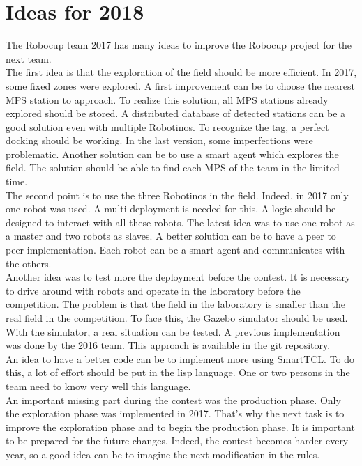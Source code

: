 \section{Ideas for 2018}

The Robocup team 2017 has many ideas to improve the Robocup project for the next team.\\

The first idea is that the exploration of the field should be more efficient. In 2017, some fixed zones were explored. A first improvement can be to choose the nearest MPS station to approach. To realize this solution, all MPS stations already explored should be stored. A distributed database of detected stations can be a good solution even with multiple Robotinos. To recognize the tag, a perfect docking should be working. In the last version, some imperfections were problematic. Another solution can be to use a smart agent which explores the field. The solution should be able to find each MPS of the team in the limited time.\\

The second point is to use the three Robotinos in the field. Indeed, in 2017 only one robot was used. A multi-deployment is needed for this. A logic should be designed to interact with all these robots. The latest idea was to use one robot as a master and two robots as slaves. A better solution can be to have a peer to peer implementation. Each robot can be a smart agent and communicates with the others.\\

Another idea was to test more the deployment before the contest. It is necessary to drive around with robots and operate in the laboratory before the competition. The problem is that the field in the laboratory is smaller than the real field in the competition. To face this, the Gazebo simulator should be used. With the simulator, a real situation can be tested. A previous implementation was done by the 2016 team. This approach is available in the git repository.\\

An idea to have a better code can be to implement more using SmartTCL. To do this, a lot of effort should be put in the lisp language. One or two persons in the team need to know very well this language. \\

An important missing part during the contest was the production phase. Only the exploration phase was implemented in 2017. That's why the next task is to improve the exploration phase and to begin the production phase. It is important to be prepared for the future changes. Indeed, the contest becomes harder every year, so a good idea can be to imagine the next modification in the rules.\\
